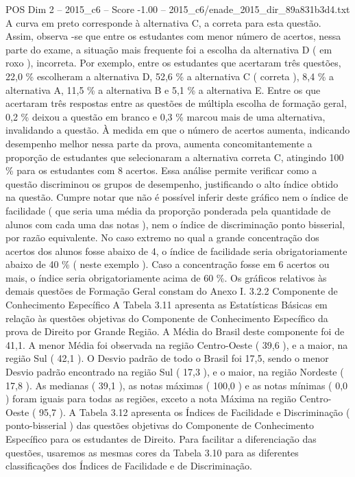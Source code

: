 \begin{textsample}{POS Dim 2 – 2015\_c6 – Score -1.00 – 2015\_c6/enade\_2015\_dir\_89a831b3d4.txt}
A curva em preto corresponde à alternativa C, a correta para esta questão.
Assim, observa -se que entre os estudantes com menor número de acertos, nessa parte do exame, a situação mais frequente foi a escolha da alternativa D ( em roxo ), incorreta.
Por exemplo, entre os estudantes que acertaram três questões, 22,0 \% escolheram a alternativa D, 52,6 \% a alternativa C ( correta ), 8,4 \% a alternativa A, 11,5 \% a alternativa B e 5,1 \% a alternativa E.
Entre os que acertaram três respostas entre as questões de múltipla escolha de formação geral, 0,2 \% deixou a questão em branco e 0,3 \% marcou mais de uma alternativa, invalidando a questão.
À medida em que o número de acertos aumenta, indicando desempenho melhor nessa parte da prova, aumenta concomitantemente a proporção de estudantes que selecionaram a alternativa correta C, atingindo 100 \% para os estudantes com 8 acertos.
Essa análise permite verificar como a questão discriminou os grupos de desempenho, justificando o alto índice obtido na questão.
Cumpre notar que não é possível inferir deste gráfico nem o índice de facilidade ( que seria uma média da proporção ponderada pela quantidade de alunos com cada uma das notas ), nem o índice de discriminação ponto bisserial, por razão equivalente.
No caso extremo no qual a grande concentração dos acertos dos alunos fosse abaixo de 4, o índice de facilidade seria obrigatoriamente abaixo de 40 \% ( neste exemplo ).
Caso a concentração fosse em 6 acertos ou mais, o índice seria obrigatoriamente acima de 60 \%.
Os gráficos relativos às demais questões de Formação Geral constam do Anexo I. 3.2.2 Componente de Conhecimento Específico A Tabela 3.11 apresenta as Estatísticas Básicas em relação às questões objetivas do Componente de Conhecimento Específico da prova de Direito por Grande Região.
A Média do Brasil deste componente foi de 41,1.
A menor Média foi observada na região Centro-Oeste ( 39,6 ), e a maior, na região Sul ( 42,1 ).
O Desvio padrão de todo o Brasil foi 17,5, sendo o menor Desvio padrão encontrado na região Sul ( 17,3 ), e o maior, na região Nordeste ( 17,8 ).
As medianas ( 39,1 ), as notas máximas ( 100,0 ) e as notas mínimas ( 0,0 ) foram iguais para todas as regiões, exceto a nota Máxima na região Centro-Oeste ( 95,7 ).
A Tabela 3.12 apresenta os Índices de Facilidade e Discriminação ( ponto-bisserial ) das questões objetivas do Componente de Conhecimento Específico para os estudantes de Direito.
Para facilitar a diferenciação das questões, usaremos as mesmas cores da Tabela 3.10 para as diferentes classificações dos Índices de Facilidade e de Discriminação.

\end{textsample}
